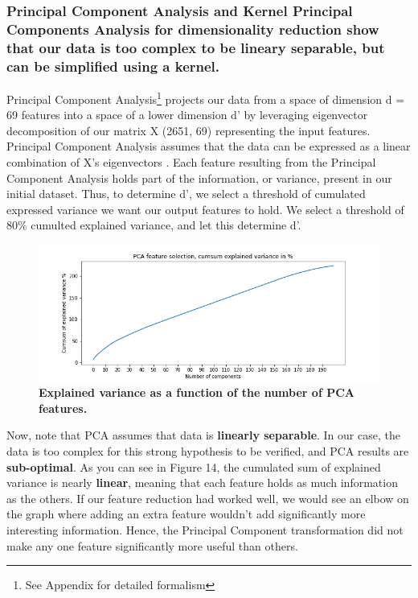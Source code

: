 \documentclass[12pt]{report}
\begin{document}
\subsubsection{Principal Component Analysis and Kernel Principal Components Analysis for dimensionality reduction show that our data is too complex to be lineary separable, but can be simplified using a kernel.}
Principal Component Analysis\footnote{See Appendix for detailed formalism} projects our data from a space of dimension d = 69 features into a space of a lower dimension d' by leveraging eigenvector decomposition of our matrix X (2651, 69) representing the input features. Principal Component Analysis assumes that the data can be expressed as a linear combination of X's eigenvectors \citep{pcatowardsdatascience}.
Each feature resulting from the Principal Component Analysis holds part of the information, or variance, present in our initial dataset. Thus, to determine d', we select a threshold of cumulated expressed variance we want our output features to hold. We select a threshold of 80\% cumulted explained variance, and let this determine d'.\newline

\begin{figure}[h!]
\centering
\includegraphics[scale=0.5]{PCA_feature_selection_cumsum.png}
\caption{\textbf{Explained variance as a function of the number of PCA features.}}
\label{fig:pcavariance}
\end{figure}

Now, note that PCA assumes that data is \textbf{linearly separable}. In our case, the data is too complex for this strong hypothesis to be verified, and PCA results are \textbf{sub-optimal}. As you can see in Figure 14, the cumulated sum of explained variance is nearly \textbf{linear}, meaning that each feature holds as much information as the others. If our feature reduction had worked well, we would see an elbow on the graph where adding an extra feature wouldn't add significantly more interesting information. Hence, the Principal Component transformation did not make any one feature significantly more useful than others. \newline
\end{document}
